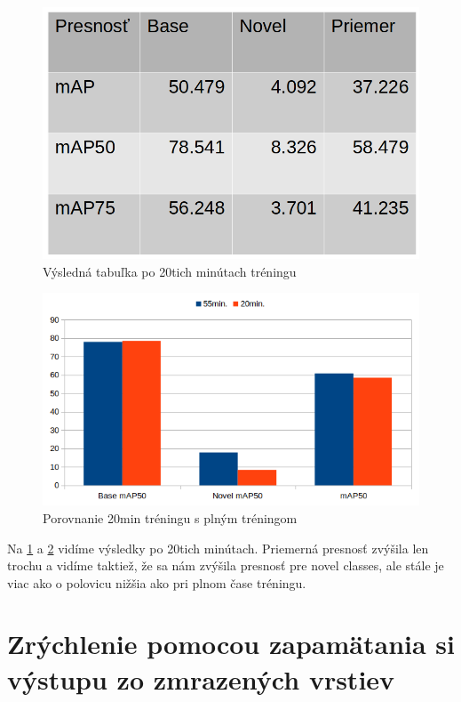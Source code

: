 \begin{figure}[H]
\centering
\includegraphics[width=\textwidth]{images/table_1shot_20minutes.png}
\caption{Výsledná tabuľka po 20tich minútach tréningu}
\label{fig:image3}
\end{figure}

\begin{figure}[H]
\centering
\includegraphics[width=\textwidth]{images/chart_compare_20min.png}
\caption{Porovnanie 20min tréningu s plným tréningom}
\label{fig:image4}
\end{figure}

Na \ref{fig:image3} a \ref{fig:image4} vidíme výsledky po 20tich minútach. Priemerná presnosť zvýšila len trochu a vidíme taktiež, že sa nám zvýšila presnosť pre novel classes, ale stále je viac ako o polovicu nižšia ako pri plnom čase tréningu.


\section{Zrýchlenie pomocou zapamätania si výstupu zo zmrazených vrstiev}

